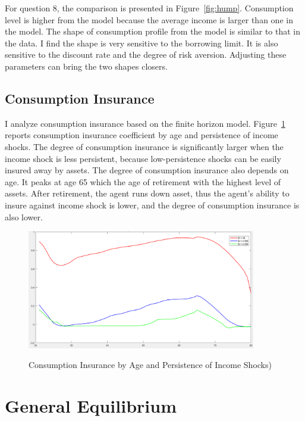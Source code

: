 \documentclass[thmsa,10pt]{article}
\begin{document}
For question 8, the comparison is presented in Figure~\ref{fig:hump}. Consumption level is higher from the model because the average income is larger than one in the model. The shape of consumption profile from the model is similar to that in the data. I find the shape is very sensitive to the borrowing limit. It is also sensitive to the discount rate and the degree of risk aversion. Adjusting these parameters can bring the two shapes closers. 


\subsection{Consumption Insurance}

I analyze consumption insurance based on the finite horizon model. Figure~\ref{fig:conins} reports consumption insurance coefficient by age and persistence of income shocks. 
The degree of consumption insurance is significantly larger when the income shock is less persistent, because low-persistence shocks can be easily insured away by assets. 
The degree of consumption insurance also depends on age. It peaks at age 65 which the age of retirement with the highest level of assets. After retirement, the agent runs down
asset, thus the agent's ability to insure against income shock is lower, and the degree of consumption insurance is also lower.

\begin{figure}[h!]
\centering
\caption{Consumption Insurance by Age and Persistence of Income Shocks)}
\includegraphics[width=10cm]{./figs/consinsurance}
\label{fig:conins}
\end{figure}


\section{General Equilibrium}
\end{document}
